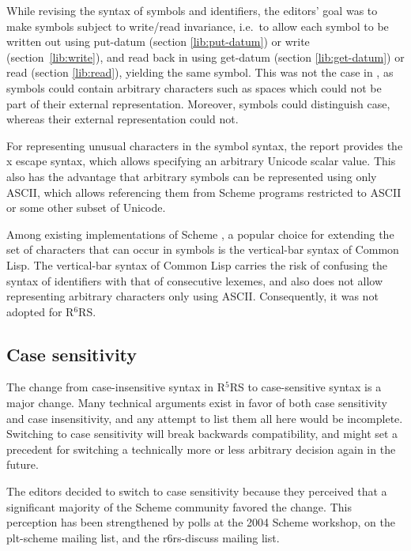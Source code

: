 \documentclass[twoside,twocolumn]{algol60}
\newcommand{\rn}[1]{R$^{#1}$RS}
\begin{document}
While revising the syntax of symbols and identifiers, the editors'
goal was to make symbols subject to write/read invariance, i.e.\ to
allow each symbol to be written out using {\cf put-datum} (section
\ref{lib:put-datum}) or {\cf write} (section~\ref{lib:write}), and
read back in using {\cf get-datum} (section \ref{lib:get-datum}) or
{\cf read} (section \ref{lib:read}), yielding the same symbol.  This
was not the case in , as symbols could contain arbitrary
characters such as spaces which could not be part of their external
representation.  Moreover, symbols could distinguish case, whereas
their external representation could not.

For representing unusual characters in the symbol syntax, the report
provides the {\cf\backwhack{}x} escape syntax, which allows specifying
an arbitrary Unicode scalar value.  This also has the advantage that
arbitrary symbols can be represented using only ASCII, which allows
referencing them from Scheme programs restricted to ASCII or some
other subset of Unicode.

Among existing implementations of Scheme , a popular choice for
extending the set of characters that can occur in symbols is the
vertical-bar syntax of Common Lisp.  The vertical-bar syntax of Common
Lisp carries the risk of confusing the syntax of identifiers with that
of consecutive lexemes, and also does not allow representing arbitrary
characters only using ASCII.  Consequently, it was not adopted for
\rn{6}.

\subsection{Case sensitivity}
\label{casesensitivityrationalesection}

The change from case-insensitive syntax in \rn{5} to case-sensitive
syntax is a major change.  Many technical arguments exist in favor of
both case sensitivity and case insensitivity, and any attempt to list
them all here would be incomplete.  
Switching to case sensitivity will break backwards compatibility, and
might set a precedent for switching a technically more or less
arbitrary decision again in the future.

The editors decided to switch to case sensitivity because they
perceived that a significant majority of the Scheme community favored
the change.  This perception has been strengthened by polls at the
2004 Scheme workshop, on the {\cf plt-scheme} mailing list, and the
{\cf r6rs-discuss} mailing list.
\end{document}
